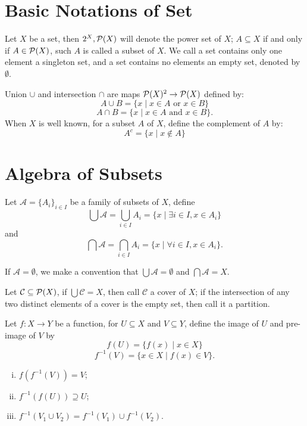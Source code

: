 \section{Basic Notations of Set}
Let $X$ be a set, then $2^X, \mathcal{P}(X)$ will denote the power set of $X$;
$A \subseteq X$ if and only if $A \in \mathcal{P}(X)$, such $A$ is called a subset of $X$.
We call a set contains only one element a singleton set,
and a set contains no elements an empty set, denoted by $\emptyset$.

Union $\cup$ and intersection $\cap$ are maps $\mathcal{P}(X)^2 \to \mathcal{P}(X)$ defined by:
$$A \cup B = \{x \mid x \in A\mbox{ or }x \in B\}$$
$$A \cap B = \{x \mid x \in A\mbox{ and }x \in B\}.$$
When $X$ is well known, for a subset $A$ of $X$, define the complement of $A$ by:
$$A^c = \{x \mid x \not\in A\}$$

\section{Algebra of Subsets}
\begin{defi}
Let $\mathcal{A} = \{A_i\}_{i \in I}$ be a family of subsets of $X$,
define
$$\bigcup \mathcal{A} = \bigcup_{i \in I} A_i = \{x \mid \exists i \in I, x \in A_i\}$$
and
$$\bigcap \mathcal{A} = \bigcap_{i \in I} A_i = \{x \mid \forall i \in I, x \in A_i\}.$$
\end{defi}
If $\mathcal{A} = \emptyset$, we make a convention that $\bigcup \mathcal{A} = \emptyset$
and $\bigcap \mathcal{A} = X$.

\begin{defi}
Let $\mathcal{C} \subseteq \mathcal{P}(X)$, if $\bigcup \mathcal{C} = X$, 
then call $\mathcal{C}$ a cover of $X$;
if the intersection of any two distinct elements of a cover is the empty set,
then call it a partition.
\end{defi}

Let $f : X \to Y$ be a function, for $U \subseteq X$ and $V \subseteq Y$,
define the image of $U$ and pre-image of $V$ by
$$f(U) = \{f(x) \mid x \in X\}$$
$$f^{-1}(V) = \{x \in X \mid f(x) \in V\}.$$

\begin{pro}
\begin{enumerate}[i).]
\item $f(f^{-1}(V)) = V$;
\item $f^{-1}(f(U)) \supseteq U$;
\item $f^{-1}(V_1 \cup V_2) = f^{-1}(V_1) \cup f^{-1}(V_2)$.
\end{enumerate}
\end{pro}

